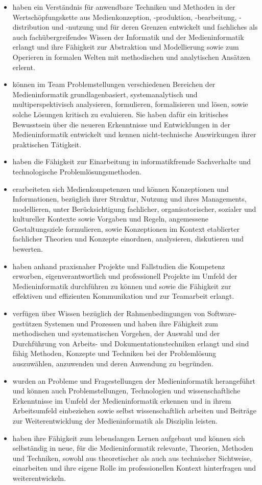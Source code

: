 \begin{itemize}
\tightlist
\item
  haben ein Verständnis für anwendbare Techniken und Methoden in der
  Wertschöpfungskette aus Medienkonzeption, -produktion, -bearbeitung,
  -distribution und -nutzung und für deren Grenzen entwickelt und
  fachliches als auch fachübergreifendes Wissen der Informatik und der
  Medieninformatik erlangt und ihre Fähigkeit zur Abstraktion und
  Modellierung sowie zum Operieren in formalen Welten mit methodischen
  und analytischen Ansätzen erlernt.
\item
  können im Team Problemstellungen verschiedenen Bereichen der
  Medieninformatik grundlagenbasiert, systemanalytisch und
  multiperspektivisch analysieren, formulieren, formalisieren und lösen,
  sowie solche Lösungen kritisch zu evaluieren. Sie haben dafür ein
  kritisches Bewusstsein über die neueren Erkenntnisse und Entwicklungen
  in der Medieninformatik entwickelt und kennen nicht-technische
  Auswirkungen ihrer praktischen Tätigkeit.
\item
  haben die Fähigkeit zur Einarbeitung in informatikfremde Sachverhalte
  und technologische Problemlösungsmethoden.
\item
  erarbeiteten sich Medienkompetenzen und können Konzeptionen und
  Informationen, bezüglich ihrer Struktur, Nutzung und ihres
  Managements, modellieren, unter Berücksichtigung fachlicher,
  organisatorischer, sozialer und kultureller Kontexte sowie Vorgaben
  und Regeln, angemessene Gestaltungsziele formulieren, sowie
  Konzeptionen im Kontext etablierter fachlicher Theorien und Konzepte
  einordnen, analysieren, diskutieren und bewerten.
\item
  haben anhand praxisnaher Projekte und Fallstudien die Kompetenz
  erworben, eigenverantwortlich und professionell Projekte im Umfeld der
  Medieninformatik durchführen zu können und sowie die Fähigkeit zur
  effektiven und effizienten Kommunikation und zur Teamarbeit erlangt.
\item
  verfügen über Wissen bezüglich der Rahmenbedingungen von
  Software-gestützen Systemen und Prozessen und haben ihre Fähigkeit zum
  methodischen und systematischen Vorgehen, der Auswahl und der
  Durchführung von Arbeits- und Dokumentationstechniken erlangt und sind
  fähig Methoden, Konzepte und Techniken bei der Problemlösung
  auszuwählen, anzuwenden und deren Anwendung zu begründen.
\item
  wurden an Probleme und Fragestellungen der Medieninformatik
  herangeführt und können auch Problemstellungen, Technologien und
  wissenschaftliche Erkenntnisse im Umfeld der Medieninformatik erkennen
  und in ihrem Arbeitsumfeld einbeziehen sowie selbst wissenschaftlich
  arbeiten und Beiträge zur Weiterentwicklung der Medieninformatik als
  Disziplin leisten.
\item
  haben ihre Fähigkeit zum lebenslangen Lernen aufgebaut und können sich
  selbständig in neue, für die Medieninformatik relevante, Theorien,
  Methoden und Techniken, sowohl aus theoretischer als auch aus
  technischer Sichtweise, einarbeiten und ihre eigene Rolle im
  professionellen Kontext hinterfragen und weiterentwickeln.
\end{itemize}

